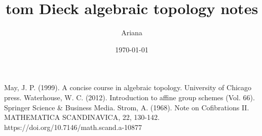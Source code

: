 \documentclass[12pt]{article}
\title{tom Dieck algebraic topology notes}
\date{\today}
\author{Ariana}
\begin{document}







\begin{thebibliography}{99}
     May, J. P. (1999). A concise course in algebraic topology. University of Chicago press.
     Waterhouse, W. C. (2012). Introduction to affine group schemes (Vol. 66). Springer Science \& Business Media.
     Strom, A. (1968). Note on Cofibrations II. MATHEMATICA SCANDINAVICA, 22, 130-142. https://doi.org/10.7146/math.scand.a-10877
\end{thebibliography}
\end{document}
